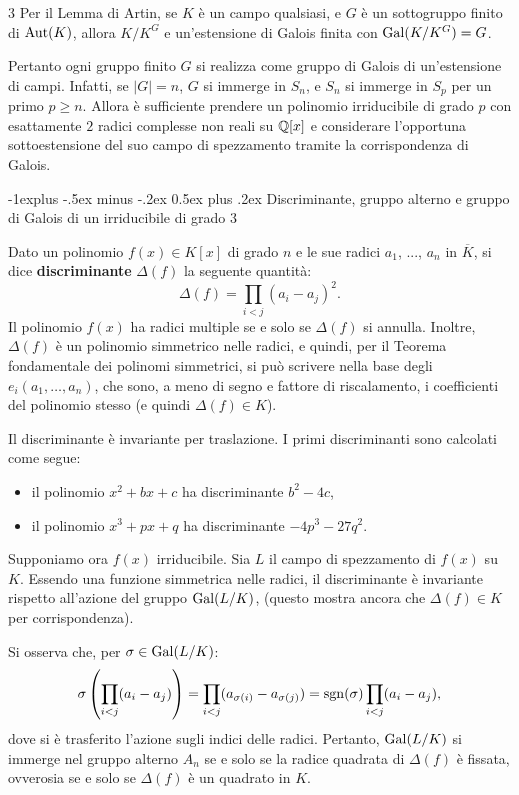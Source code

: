 \documentclass[10pt,landscape]{article}
\makeatletter
\renewcommand{\subsection}{\@startsection{subsection}{2}{0mm}%
	{-1explus -.5ex minus -.2ex}%
	{0.5ex plus .2ex}%
	{\normalfont\normalsize\bfseries}}
\makeatother
\begin{document}
\begin{multicols}{3}
	Per il Lemma di Artin, se $K$ è un campo qualsiasi, e $G$ è un sottogruppo finito di $\operatorname{Aut}(K)$, allora
	$K/K^G$ e un'estensione di Galois finita con $\operatorname{Gal}(K/K^G) = G$. \smallskip

	Pertanto ogni gruppo finito $G$ si realizza come gruppo di Galois di un'estensione di campi. Infatti,
	se $|G| = n$, $G$ si immerge in $S_n$, e $S_n$ si immerge in $S_p$ per un primo $p \geq n$. Allora è
	sufficiente prendere un polinomio irriducibile di grado $p$ con esattamente $2$ radici
	complesse non reali su $\mathbb Q[x]$ e considerare l'opportuna sottoestensione del suo campo di spezzamento
	tramite la corrispondenza di Galois.

	\subsection{Discriminante, gruppo alterno e gruppo di Galois di un irriducibile di grado \texorpdfstring{$3$}{3}}

	Dato un polinomio $f(x) \in K[x]$ di grado $n$ e le sue radici
	$a_1$, ..., $a_n$ in $\overline{K}$, si dice \textbf{discriminante}
	$\Delta(f)$ la seguente quantità:
	\[
		\Delta(f) = \prod_{i < j} (a_i - a_j)^2.
	\]
	Il polinomio $f(x)$ ha radici multiple se e solo se
	$\Delta(f)$ si annulla. Inoltre, $\Delta(f)$ è un polinomio
	simmetrico nelle radici, e quindi, per il Teorema fondamentale
	dei polinomi simmetrici, si può scrivere nella base degli
	$e_i(a_1, \ldots, a_n)$, che sono, a meno di segno e fattore di
	riscalamento, i coefficienti del polinomio stesso (e quindi
	$\Delta(f) \in K$). \smallskip

	Il discriminante è invariante per traslazione. I primi discriminanti
	sono calcolati come segue:
	\begin{itemize}
		\item il polinomio $x^2 + bx + c$ ha discriminante $b^2 - 4c$,
		\item il polinomio $x^3 + px + q$ ha discriminante $-4p^3-27q^2$.
	\end{itemize}

	Supponiamo ora $f(x)$ irriducibile. Sia $L$ il campo di spezzamento di
	$f(x)$ su $K$.
	Essendo una funzione simmetrica nelle radici, il discriminante è invariante
	rispetto all'azione del gruppo $\operatorname{Gal}(L/K)$, (questo mostra ancora che
	$\Delta(f) \in K$ per corrispondenza). \smallskip

	Si osserva che, per $\sigma \in \operatorname{Gal}(L/K)$:
	\[
		\sigma\left(\prod_{i < j} (a_i - a_j)\right) = \prod_{i < j} (a_{\sigma(i)} - a_{\sigma(j)}) = \operatorname{sgn}(\sigma) \prod_{i < j} (a_i - a_j),
	\]
	dove si è trasferito l'azione sugli indici delle radici. Pertanto,
	$\operatorname{Gal}(L/K)$ si immerge nel gruppo alterno $A_n$ se e solo se
	la radice quadrata di $\Delta(f)$ è fissata, ovverosia se e solo se
	$\Delta(f)$ è un quadrato in $K$. \smallskip


\end{multicols}
\end{document}
